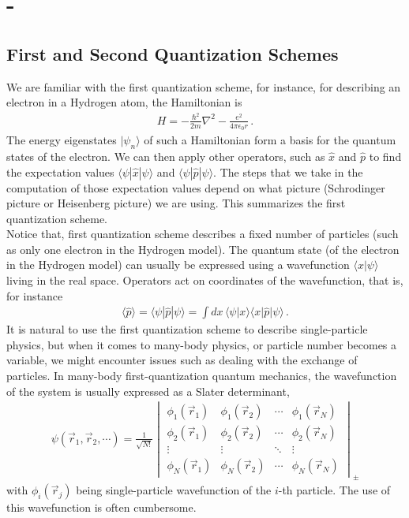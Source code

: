 \documentclass[11pt, onesided]{book}
\theoremstyle{break}
\theoremstyle{break}
\newcommand{\vmat}[1]{\begin{vmatrix} #1 \end{vmatrix}}
\begin{document}
\tableofcontents

\newpage
\chapter{-}
\section{First and Second Quantization Schemes}
We are familiar with the first quantization scheme, for instance, for describing an electron in a Hydrogen atom, the Hamiltonian is 
\begin{align*}
H =  -\frac{\hbar^2}{2m}\nabla^2 - \frac{e^2}{4\pi \epsilon_0 r}\,.
\end{align*}
The energy eigenstates $|\psi_n\rangle$ of such a Hamiltonian form a basis for the quantum states of the electron. We can then apply other operators, such as $\hat{x}$ and $\hat{p}$ to find the expectation values $\langle \psi | \hat{x}|\psi\rangle$ and $\langle \psi |\hat{p}|\psi\rangle$. The steps that we take in the computation of those expectation values depend on what picture (Schrodinger picture or Heisenberg picture) we are using. This summarizes the first quantization scheme.\\

Notice that, first quantization scheme describes a fixed number of particles (such as only one electron in the Hydrogen model). The quantum state (of the electron in the Hydrogen model) can usually be expressed using a wavefunction $\langle x | \psi\rangle$ living in the real space. Operators act on coordinates of the wavefunction, that is, for instance
\begin{align*}
\langle \hat{p}\rangle = \langle \psi | \hat{p}|\psi\rangle = \int dx \, \langle \psi | x\rangle \langle x | \hat{p} |\psi\rangle\,.
\end{align*}
It is natural to use the first quantization scheme to describe single-particle physics, but when it comes to many-body physics, or particle number becomes a variable, we might encounter issues such as dealing with the exchange of particles. In many-body first-quantization quantum mechanics, the wavefunction of the system is usually expressed as a Slater determinant, 
\begin{align*}
\psi(\vec{r}_1, \vec{r}_2,\cdots ) = \frac{1}{\sqrt{N!}} \vmat{\phi_1(\vec{r}_1) & \phi_1(\vec{r}_2) & \cdots & \phi_1(\vec{r}_N) \\
\phi_2(\vec{r}_1) & \phi_2(\vec{r}_2) & \cdots & \phi_2(\vec{r}_N) \\
\vdots & \vdots & \ddots & \vdots\\
\phi_N(\vec{r}_1) & \phi_N(\vec{r}_2) & \cdots & \phi_N(\vec{r}_N) }_\pm
\end{align*}
with $\phi_i(\vec{r}_j)$ being single-particle wavefunction of the $i$-th particle. The use of this wavefunction is often cumbersome.\\
\end{document}
